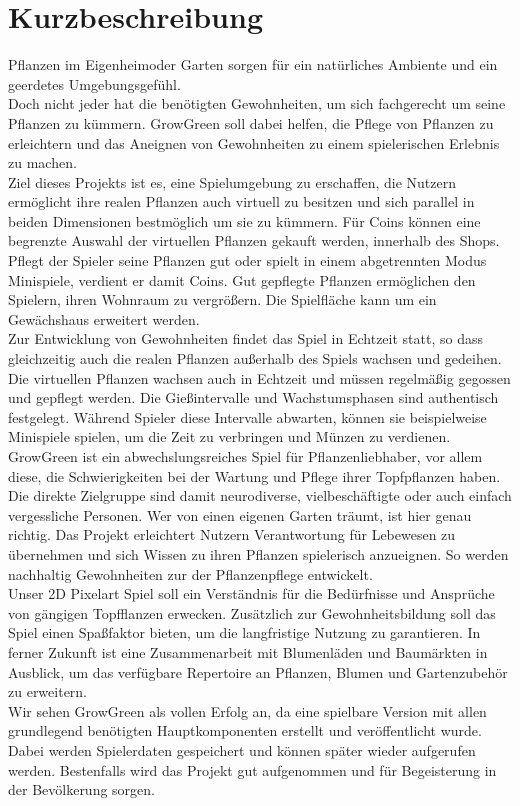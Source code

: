 \chapter{Kurzbeschreibung}\label{ch:kurzbeschreibung}
Pflanzen im Eigenheimoder Garten sorgen für ein natürliches Ambiente und ein geerdetes Umgebungsgefühl.\\
Doch nicht jeder hat die benötigten Gewohnheiten, um sich fachgerecht um seine Pflanzen zu kümmern.
GrowGreen soll dabei helfen, die Pflege von Pflanzen zu erleichtern und das Aneignen von Gewohnheiten 
zu einem spielerischen Erlebnis zu machen.\\[7pt]
Ziel dieses Projekts ist es, eine Spielumgebung zu erschaffen, die Nutzern ermöglicht ihre realen Pflanzen auch virtuell zu besitzen 
und sich parallel in beiden Dimensionen bestmöglich um sie zu kümmern. 
Für Coins können eine begrenzte Auswahl der virtuellen Pflanzen gekauft werden, innerhalb des Shops. 
Pflegt der Spieler seine Pflanzen gut oder spielt in einem abgetrennten Modus Minispiele, verdient er damit Coins. 
Gut gepflegte Pflanzen ermöglichen den Spielern, ihren Wohnraum zu vergrößern. Die Spielfläche kann um ein
Gewächshaus erweitert werden.\\[7pt]
Zur Entwicklung von Gewohnheiten findet das Spiel in Echtzeit statt, so dass gleichzeitig auch die realen Pflanzen
außerhalb des Spiels wachsen und gedeihen.
Die virtuellen Pflanzen wachsen auch in Echtzeit und müssen regelmäßig gegossen und gepflegt werden.
Die Gießintervalle und Wachstumsphasen sind authentisch festgelegt.
Während Spieler diese Intervalle abwarten, können sie beispielweise Minispiele spielen, um die Zeit zu verbringen und 
Münzen zu verdienen. \\[7pt]
GrowGreen ist ein abwechslungsreiches Spiel für Pflanzenliebhaber, vor allem diese, die Schwierigkeiten bei der Wartung und 
Pflege ihrer Topfpflanzen haben. Die direkte Zielgruppe sind damit neurodiverse, vielbeschäftigte oder auch einfach vergessliche Personen. Wer von einen eigenen Garten träumt, ist hier genau richtig. 
Das Projekt erleichtert Nutzern Verantwortung für Lebewesen zu übernehmen und sich Wissen zu ihren Pflanzen 
spielerisch anzueignen. So werden nachhaltig Gewohnheiten zur der Pflanzenpflege entwickelt.\\[7pt]
Unser 2D Pixelart Spiel soll ein Verständnis für die Bedürfnisse und Ansprüche von gängigen Topfflanzen erwecken.
Zusätzlich zur Gewohnheitsbildung soll das Spiel einen Spaßfaktor bieten, um die langfristige Nutzung zu garantieren.
In ferner Zukunft ist eine Zusammenarbeit mit Blumenläden und Baumärkten in Ausblick, um
das verfügbare Repertoire an Pflanzen, Blumen und Gartenzubehör zu erweitern. \\[7pt]
Wir sehen GrowGreen als vollen Erfolg an, da eine spielbare Version mit allen grundlegend benötigten Hauptkomponenten 
erstellt und veröffentlicht wurde.
Dabei werden Spielerdaten gespeichert und können später wieder aufgerufen werden.
Bestenfalls wird das Projekt gut aufgenommen und für Begeisterung in der Bevölkerung sorgen.